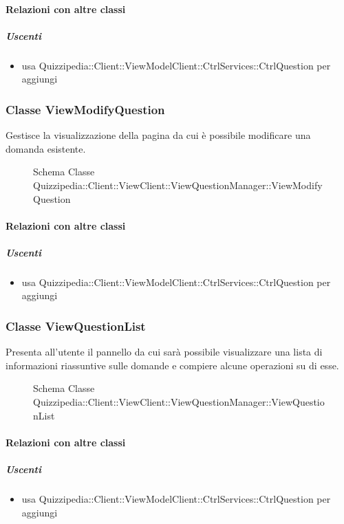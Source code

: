 \paragraph{Relazioni con altre classi}
\subparagraph{Uscenti}
\begin{itemize}
\item usa Quizzipedia::Client::ViewModelClient::CtrlServices::CtrlQuestion per aggiungi
\end{itemize}
\subsubsection{Classe ViewModifyQuestion}
Gestisce la visualizzazione della pagina da cui è possibile modificare una domanda esistente.
\begin{figure}[H]
\centering
\noindent{}
\caption[Schema Classe ViewModifyQuestion]{Schema Classe Quizzipedia::Client::ViewClient::ViewQuestionManager::ViewModifyQuestion}
\end{figure}
\paragraph{Relazioni con altre classi}
\subparagraph{Uscenti}
\begin{itemize}
\item usa Quizzipedia::Client::ViewModelClient::CtrlServices::CtrlQuestion per aggiungi
\end{itemize}
\subsubsection{Classe ViewQuestionList}
Presenta all'utente il pannello da cui sarà possibile visualizzare una lista di informazioni riassuntive sulle domande e compiere alcune operazioni su di esse.
\begin{figure}[H]
\centering
\noindent{}
\caption[Schema Classe ViewQuestionList]{Schema Classe Quizzipedia::Client::ViewClient::ViewQuestionManager::ViewQuestionList}
\end{figure}
\paragraph{Relazioni con altre classi}
\subparagraph{Uscenti}
\begin{itemize}
\item usa Quizzipedia::Client::ViewModelClient::CtrlServices::CtrlQuestion per aggiungi
\end{itemize}
